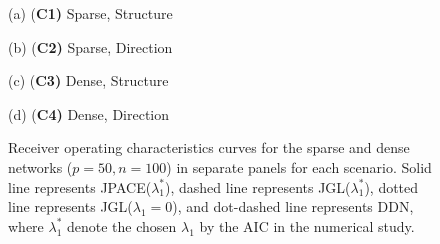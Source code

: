 \documentclass[useAMS,usenatbib,referee]{bio}
\begin{document}
{\begin{figure}[htb!] %
\begin{center} \medskip
\begin{minipage}[b]{.48\linewidth}
  \centering   \centerline{}
  \centerline{(a) {(\bf C1)} Sparse, Structure}
\end{minipage} \medskip
\begin{minipage}[b]{.48\linewidth}
  \centering   \centerline{}
  \centerline{(b) {(\bf C2)} Sparse, Direction }
\end{minipage}
\medskip
\begin{minipage}[b]{.48\linewidth}
  \centering   \centerline{}
  \centerline{(c) {(\bf C3)} Dense, Structure}
\end{minipage}
\begin{minipage}[b]{.48\linewidth}
  \centering   \centerline{}
  \centerline{(d) {(\bf C4)} Dense, Direction}
\end{minipage}
\caption{Receiver operating characteristics curves for the sparse and 
dense networks ($p=50, n=100$) in separate panels for each scenario. 
Solid line represents JPACE($\lambda_1^*$), dashed line represents
JGL($\lambda_1^*$), dotted line represents JGL($\lambda_1=0$), 
and dot-dashed line represents DDN, where $\lambda_1^*$ denote 
the chosen $\lambda_1$ by the AIC in the numerical study.}
\end{center}
\end{figure}



}
\end{document}
